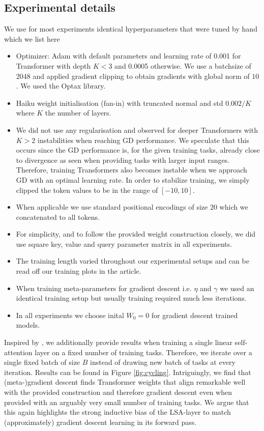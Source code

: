 \documentclass{article}
\theoremstyle{plain}
\theoremstyle{definition}
\theoremstyle{remark}
\begin{document}
\subsection{Experimental details}

We use for most experiments identical hyperparameters that were tuned by hand which we list here

\label{app:ex_det}
\begin{itemize}
    \item Optimizer: Adam \citep{adam} with default parameters and learning rate of 0.001 for Transformer with depth $K<3$ and 0.0005 otherwise. We use a batchsize of 2048 and applied gradient clipping to obtain gradients with global norm of $10$. We used the Optax library. 
    \item Haiku weight initialisation (fan-in) with truncated normal and std $0.002/K$ where $K$ the number of layers.
    \item We did not use any regularisation and observed for deeper Transformers with $K>2$ instabilities when reaching GD performance. We speculate that this occurs since the GD performance is, for the given training tasks, already close to divergence as seen when providing tasks with larger input ranges. 
    Therefore, training Transformers also becomes instable when we approach GD with an optimal learning rate. In order to stabilize training, we simply clipped the token values to be in the range of $[-10, 10]$.
    \item  When applicable we use standard positional encodings of size $20$ which we concatenated to all tokens.
    \item  For simplicity, and to follow the provided weight construction closely, we did use square key, value and query parameter matrix in all experiments.
    \item The training length varied throughout our experimental setups and can be read off our training plots in the article. 
    \item When training meta-parameters for gradient descent i.e. $\eta$ and $\gamma$ we used an identical training setup but usually training required much less iterations.
    \item In all experiments we choose inital $W_0=0$ for gradient descent trained models.
\end{itemize}

Inspired by \cite{simple_case_study}, we additionally provide results when training a single linear self-attention layer on a fixed number of training tasks. Therefore, we iterate over a single fixed batch of size $B$ instead of drawing new batch of tasks at every iteration. Results can be found in Figure \ref{fig:cycling}. Intriguingly, we find that (meta-)gradient descent finds Transformer weights that align remarkable well with the provided construction and therefore gradient descent even when provided with an arguably very small number of training tasks. We argue that this again highlights the strong inductive bias of the LSA-layer to match (approximately) gradient descent learning in its forward pass.
\end{document}
